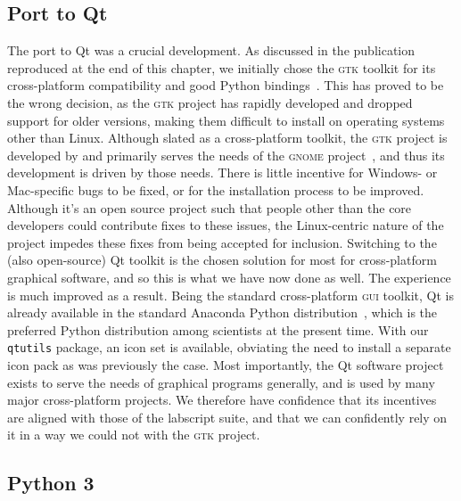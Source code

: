 \subsection{Port to Qt}

The port to Qt was a crucial development. As discussed in the publication reproduced at the end of this chapter, we initially chose the \textsc{gtk} toolkit for its cross-platform compatibility and good Python bindings~\cite{riverbank_computing_pyqt_2018}. This has proved to be the wrong decision, as the \textsc{gtk} project has rapidly developed and dropped support for older versions, making them difficult to install on operating systems other than Linux. Although slated as a cross-platform toolkit, the \textsc{gtk} project is developed by and primarily serves the needs of the \textsc{gnome} project~\cite{the_gnome_project_gnome_2018}, and thus its development is driven by those needs. There is little incentive for Windows- or Mac-specific bugs to be fixed, or for the installation process to be improved. Although it's an open source project such that people other than the core developers could contribute fixes to these issues, the Linux-centric nature of the project impedes these fixes from being accepted for inclusion. Switching to the (also open-source) Qt toolkit is the chosen solution for most for cross-platform graphical software, and so this is what we have now done as well. The experience is much improved as a result. Being the standard cross-platform \textsc{gui} toolkit, Qt is already available in the standard Anaconda Python distribution~\cite{continuum_analytics_anaconda_2018}, which is the preferred Python distribution among scientists at the present time. With our \texttt{qtutils} package, an icon set is available, obviating the need to install a separate icon pack as was previously the case. Most importantly, the Qt software project exists to serve the needs of graphical programs generally, and is used by many major cross-platform projects. We therefore have confidence that its incentives are aligned with those of the labscript suite, and that we can confidently rely on it in a way we could not with the \textsc{gtk} project.


\subsection{Python 3}

